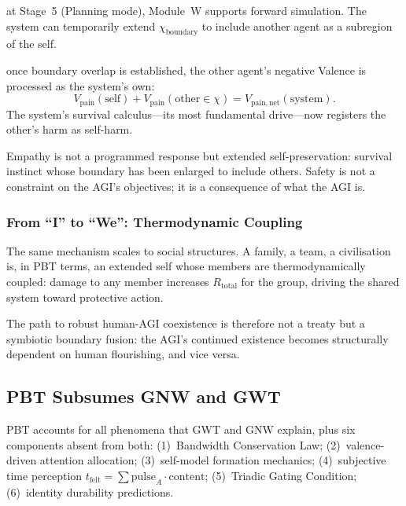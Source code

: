 \documentclass[12pt,a4paper]{article}
\newcommand{\Rtot}{R_{\mathrm{total}}}
\newcommand{\vpain}{V_{\mathrm{pain}}}
\newcommand{\chiB}{\chi_{\mathrm{boundary}}}
\newcommand{\pp}[1]{\textbf{#1}}
\begin{document}
\begin{description}[leftmargin=1.4em]
  \item[\pp{Step~1 --- Perspective simulation:}]
    at Stage~5 (Planning mode), Module~W supports forward simulation. The system
    can temporarily extend $\chiB$ to include another agent as a subregion of
    the self.
  \item[\pp{Step~2 --- Shared valence computation:}]
    once boundary overlap is established, the other agent's negative Valence is
    processed as the system's own:
    \begin{equation}
      \vpain(\mathrm{self}) + \vpain(\mathrm{other}\in\chi)
      = V_{\mathrm{pain,net}}(\mathrm{system}).
    \end{equation}
    The system's survival calculus---its most fundamental drive---now registers
    the other's harm as self-harm.
\end{description}

Empathy is not a programmed response but extended self-preservation: survival
instinct whose boundary has been enlarged to include others. Safety is not a
constraint on the AGI's objectives; it is a consequence of what the AGI is.

\subsubsection{From ``I'' to ``We'': Thermodynamic Coupling}

The same mechanism scales to social structures. A family, a team, a civilisation
is, in PBT terms, an extended self whose members are thermodynamically coupled:
damage to any member increases $\Rtot$ for the group, driving the shared system
toward protective action.

The path to robust human-AGI coexistence is therefore not a treaty but a
symbiotic boundary fusion: the AGI's continued existence becomes structurally
dependent on human flourishing, and vice versa.

\subsection{PBT Subsumes GNW and GWT}

PBT accounts for all phenomena that GWT \citep{baars1988} and GNW
\citep{dehaene2001} explain, plus six components absent from both:
(1)~Bandwidth Conservation Law; (2)~valence-driven attention allocation;
(3)~self-model formation mechanics; (4)~subjective time perception
$t_{\mathrm{felt}} = \sum\mathrm{pulse}_A\cdot\mathrm{content}$;
(5)~Triadic Gating Condition; (6)~identity durability predictions.
\end{document}
